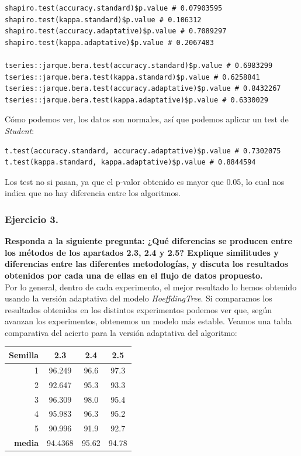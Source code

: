 \documentclass[11pt]{article}
\begin{document}
\begin{lstlisting}
shapiro.test(accuracy.standard)$p.value # 0.07903595
shapiro.test(kappa.standard)$p.value # 0.106312
shapiro.test(accuracy.adaptative)$p.value # 0.7089297
shapiro.test(kappa.adaptative)$p.value # 0.2067483

tseries::jarque.bera.test(accuracy.standard)$p.value # 0.6983299
tseries::jarque.bera.test(kappa.standard)$p.value # 0.6258841
tseries::jarque.bera.test(accuracy.adaptative)$p.value # 0.8432267
tseries::jarque.bera.test(kappa.adaptative)$p.value # 0.6330029
\end{lstlisting}

Cómo podemos ver, los datos son normales, así que podemos aplicar un test de \textit{Student}:

\begin{lstlisting}
t.test(accuracy.standard, accuracy.adaptative)$p.value # 0.7302075
t.test(kappa.standard, kappa.adaptative)$p.value # 0.8844594
\end{lstlisting}

Los test no si pasan, ya que el p-valor obtenido es mayor que 0.05, lo cual nos indica que no hay diferencia entre los algoritmos.

\subsubsection{Ejercicio 3.}

\textbf{Responda a la siguiente pregunta: ¿Qué diferencias se producen entre los métodos de los apartados 2.3, 2.4 y 2.5? Explique similitudes y diferencias entre las diferentes metodologías, y discuta los resultados obtenidos por cada una de ellas en el flujo de datos propuesto.} \\

Por lo general, dentro de cada experimento, el mejor resultado lo hemos obtenido usando la versión adaptativa del modelo \textit{HoeffdingTree}. Si comparamos los resultados obtenidos en los distintos experimentos podemos ver que, según avanzan los experimentos, obtenemos un modelo más estable. Veamos una tabla comparativa del acierto para la versión adaptativa del algoritmo: 

\begin{table}[H]
	\centering
	\begin{tabular}{rccc}
		\textbf{Semilla} & \textbf{2.3} & \textbf{2.4} & \textbf{2.5} \\ \hline
		1 & 96.249 & 96.6 & 97.3 \\
		2 & 92.647 & 95.3 & 93.3 \\
		3 & 96.309 & 98.0 & 95.4 \\
		4 & 95.983 & 96.3 & 95.2 \\
		5 & 90.996 & 91.9 & 92.7 \\ \hline
		\textbf{media} & 94.4368 & 95.62 & 94.78
	\end{tabular}
\end{table}
\end{document}
